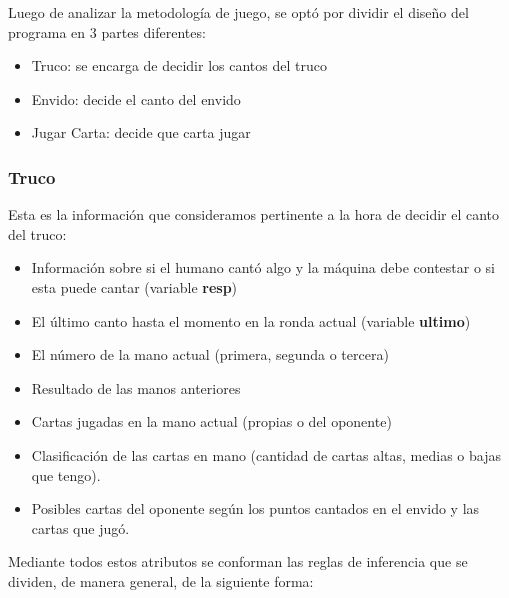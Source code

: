 \documentclass[12pt,a4paper]{article}
\begin{document}

Luego de analizar la metodolog\'ia de juego, se opt\'o por dividir el dise\~no del programa en 3 partes diferentes:
\begin{itemize}
\item Truco: se encarga de decidir los cantos del truco
\item Envido: decide el canto del envido
\item Jugar Carta: decide que carta jugar
\end{itemize}
 

\subsubsection{Truco}
Esta es la informaci\'on que consideramos pertinente a la hora de decidir el canto del truco:
\begin{itemize}
\item Informaci\'on sobre si el humano cant\'o algo y la m\'aquina debe contestar o si esta puede cantar (variable \textbf{resp})
\item El \'ultimo canto hasta el momento en la ronda actual (variable \textbf{ultimo})
\item El n\'umero de la mano actual (primera, segunda o tercera)
\item Resultado de las manos anteriores
\item Cartas jugadas en la mano actual (propias o del oponente)
\item Clasificaci\'on de las cartas en mano (cantidad de cartas altas, medias o bajas que tengo).
\item Posibles cartas del oponente seg\'un los puntos cantados en el envido y las cartas que jug\'o.
\end{itemize}

Mediante todos estos atributos se conforman las reglas de inferencia que se dividen, de manera general, de la 
siguiente forma:
\end{document}
